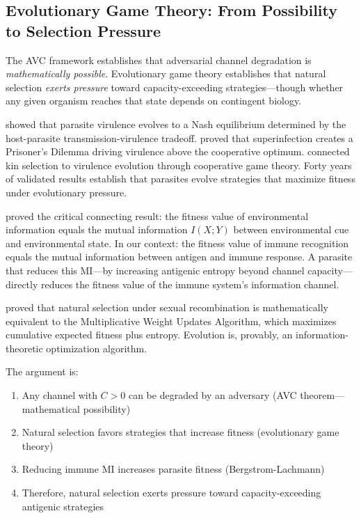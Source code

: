 \documentclass[twocolumn,10pt]{article}
\begin{document}
\subsection{Evolutionary Game Theory: From Possibility to Selection Pressure}

The AVC framework establishes that adversarial channel degradation is \emph{mathematically possible}.  Evolutionary game theory establishes that natural selection \emph{exerts pressure} toward capacity-exceeding strategies---though whether any given organism reaches that state depends on contingent biology.

\citet{bremermann1983} showed that parasite virulence evolves to a Nash equilibrium determined by the host-parasite transmission-virulence tradeoff.  \citet{nowak1994} proved that superinfection creates a Prisoner's Dilemma driving virulence above the cooperative optimum.  \citet{frank1996} connected kin selection to virulence evolution through cooperative game theory.  Forty years of validated results establish that parasites evolve strategies that maximize fitness under evolutionary pressure.

\citet{bergstrom2005} proved the critical connecting result: the fitness value of environmental information equals the mutual information $I(X;Y)$ between environmental cue and environmental state.  In our context: the fitness value of immune recognition equals the mutual information between antigen and immune response.  A parasite that reduces this MI---by increasing antigenic entropy beyond channel capacity---directly reduces the fitness value of the immune system's information channel.

\citet{chastain2014} proved that natural selection under sexual recombination is mathematically equivalent to the Multiplicative Weight Updates Algorithm, which maximizes cumulative expected fitness plus entropy.  Evolution is, provably, an information-theoretic optimization algorithm.

The argument is:
\begin{enumerate}
\item Any channel with $C > 0$ can be degraded by an adversary (AVC theorem---mathematical possibility)
\item Natural selection favors strategies that increase fitness (evolutionary game theory)
\item Reducing immune MI increases parasite fitness (Bergstrom-Lachmann)
\item Therefore, natural selection exerts pressure toward capacity-exceeding antigenic strategies
\end{enumerate}
\end{document}
